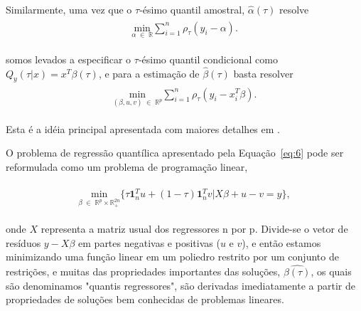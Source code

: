 \documentclass[paper=a4, fontsize=11pt]{scrartcl}
\numberwithin{equation}{section}		%
\numberwithin{figure}{section}			%
\numberwithin{table}{section}				%
\begin{document}
Similarmente, uma vez que o $\tau$-ésimo quantil amostral, $\hat{\alpha}(\tau)$ resolve
\vspace{-10pt}
\begin{align} 
	\begin{split}
	\underset{\alpha \; \in \; \mathbb{R} }{\text{min}} \sum_{i=1}^{n} \rho_{\tau}(y_{i}-\alpha). \label{eq:5}
	\end{split}					
\end{align}

{\parindent0pt somos levados a especificar o $\tau$-ésimo quantil condicional como $ Q_{y}(\tau|x)=x^{T}\beta(\tau) $, e para a estimação de $ \hat{\beta}(\tau) $ basta resolver}
\vspace{-10pt}
\begin{align} 
	\begin{split}
	\underset{(\beta,u,v) \; \in \; \mathbb{R}^{p} }{\text{min}} \sum_{i=1}^{n} \rho_{\tau}(y_{i}-x_{i}^{T}\beta). \label{eq:6}
	\end{split}					
\end{align}

Esta é a idéia principal apresentada com maiores detalhes em \cite{koenker1978regression}.

O problema de regressão quantílica apresentado pela Equação~\eqref{eq:6} pode ser reformulada como um problema de programação linear,

\vspace{-10pt}
\begin{align} 
	\begin{split}
	\underset{\beta \; \in \; \mathbb{R}^{p} \times \mathbb{R}^{2n}_{+} }{\text{min}} \{\tau \mathbf{1}_{n}^{T}u + (1-\tau)\mathbf{1}_{n}^{T}v | X\beta + u - v = y \} ,\label{eq:7}
	\end{split}					
\end{align}

{\parindent0pt onde $ X $ representa a matriz usual dos regressores n por p. Divide-se o vetor de resíduos $ y-X\beta $ em partes negativas e positivas ($u$ e $v$), e então estamos minimizando uma função linear em um poliedro restrito por um conjunto de restrições, e muitas das propriedades importantes das soluções, $\hat{\beta(\tau)}$, os quais são denominamos "quantis regressores", são derivadas imediatamente a partir de propriedades de soluções bem conhecidas de problemas lineares. }


\end{document}
